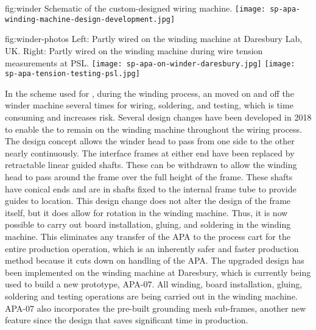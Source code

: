 \begin{dunefigure}{fig:winder}
{Schematic of the custom-designed  wiring machine. 
}
\texttt{[image: sp-apa-winding-machine-design-development.jpg]} 
\end{dunefigure}

\begin{dunefigure}{fig:winder-photos}
{Left: Partly wired   on the winding machine at Daresbury Lab, UK. Right: Partly wired   on the winding machine during wire tension measurements at PSL.}
\texttt{[image: sp-apa-on-winder-daresbury.jpg]}
\texttt{[image: sp-apa-tension-testing-psl.jpg]}
\end{dunefigure}

In the scheme used for , during the winding process, an  moved on and off the winder machine several times for wiring, soldering, and testing, which is time consuming and increases risk.  Several design changes have been developed in 2018 to enable the  to remain on the winding machine throughout the wiring process. The design concept allows the winder head to pass from one side to the other nearly continuously. The interface frames at either end have been replaced by retractable linear guided shafts. These can be withdrawn to allow the winding head to pass around the frame over the full height of the frame. These shafts have conical ends and are in shafts fixed to the internal frame tube to provide guides to location. This design change does not alter the design of the frame itself, but it does allow for rotation in the winding machine. Thus, it is now possible to carry out board installation, gluing, and soldering in the winding machine. This eliminates any transfer of the APA to the process cart for the entire production operation, which is an inherently safer and faster production method because it cuts down on handling of the APA.  The upgraded design has been implemented on the winding machine at Daresbury, which is currently being used to build a new prototype, APA-07. All winding, board installation, gluing, soldering and testing operations are being carried out in the winding machine. APA-07 also incorporates the pre-built grounding mesh sub-frames, another new feature since the  design that saves significant time in production.  

